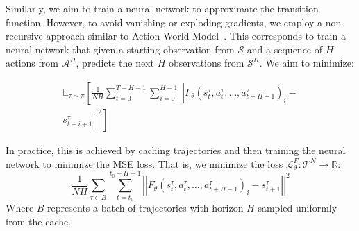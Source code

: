 Similarly, we aim to train a neural network to approximate the transition function. However, to avoid vanishing or exploding gradients, we employ a non-recursive approach similar to Action World Model~\cite{Ma24}. This corresponds to train a neural network that given a starting observation from $\mathcal{S}$ and a sequence of $H$ actions from $\mathcal{A}^H$, predicts the next $H$ observations from $\mathcal{S}^H$. We aim to minimize:

\begin{equation}
\begin{aligned}
\mathbb{E}_{\tau\sim\pi}\left[\frac{1}{NH}\sum_{t=0}^{T-H-1}\sum_{i=0}^{H-1} \left|\left| F_{\theta}(s_t^\tau, a_t^\tau, \dots, a_{t+H-1}^\tau)_i - \right.\right.\right. \\ \left.\left.\left. s_{t+i+1}^\tau \right|\right|^2\right] 
\end{aligned}
\end{equation}

In practice, this is achieved by caching trajectories and then training the neural network to minimize the MSE loss. That is, we minimize the loss $\mathcal{L}_\theta^{F}:\mathcal{T}^N\rightarrow\mathbb{R}$:
$$ \frac{1}{NH}\sum_{\tau \in B}\sum_{t=t_0}^{t_0+H-1}\left|\left| F_{\theta}(s_t^\tau, a_t^\tau, \dots, a_{t+H-1}^\tau)_i - s_{t+1}^\tau \right|\right|^2 $$
Where $B$ represents a batch of trajectories with horizon $H$ sampled uniformly from the cache.

